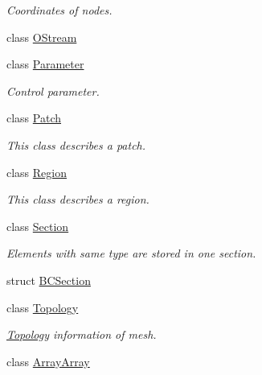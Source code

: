 \begin{DoxyCompactItemize}
\begin{DoxyCompactList}\small\item\em Coordinates of nodes. \item\end{DoxyCompactList}\item 
class \hyperlink{classHSF_1_1OStream}{OStream}
\item 
class \hyperlink{classHSF_1_1Parameter}{Parameter}
\begin{DoxyCompactList}\small\item\em Control parameter. \item\end{DoxyCompactList}\item 
class \hyperlink{classHSF_1_1Patch}{Patch}
\begin{DoxyCompactList}\small\item\em This class describes a patch. \item\end{DoxyCompactList}\item 
class \hyperlink{classHSF_1_1Region}{Region}
\begin{DoxyCompactList}\small\item\em This class describes a region. \item\end{DoxyCompactList}\item 
class \hyperlink{classHSF_1_1Section}{Section}
\begin{DoxyCompactList}\small\item\em Elements with same type are stored in one section. \item\end{DoxyCompactList}\item 
struct \hyperlink{structHSF_1_1BCSection}{BCSection}
\item 
class \hyperlink{classHSF_1_1Topology}{Topology}
\begin{DoxyCompactList}\small\item\em \hyperlink{classHSF_1_1Topology}{Topology} information of mesh. \item\end{DoxyCompactList}\item 
class \hyperlink{classHSF_1_1ArrayArray}{ArrayArray}
\end{DoxyCompactItemize}
